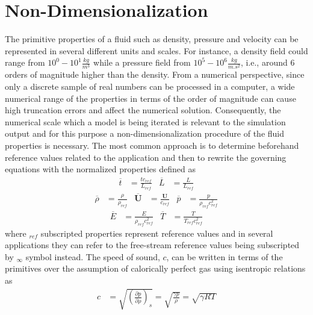 \section{Non-Dimensionalization}
%
The primitive properties of a fluid such as density, pressure and velocity can be represented in several different units and scales. For instance, a density field could range from $10^0-10^1 \frac{kg}{m^3}$ while a pressure field from $10^5-10^6 \frac{kg}{m.s^2}$, i.e., around 6 orders of magnitude higher than the density. From a numerical perspective, since only a discrete sample of real numbers can be processed in a computer, a wide numerical range of the properties in terms of the order of magnitude can cause high truncation errors and affect the numerical solution. Consequently, the numerical scale which a model is being iterated is relevant to the simulation output and for this purpose a non-dimensionalization procedure of the fluid properties is necessary. The most common approach is to determine beforehand reference values related to the application and then to rewrite the governing equations with the normalized properties defined as
%
\begin{align}
    \label{non_dim}
	\overline{t} &= \frac{t  c_{ref}}{L_{ref}} &
	\overline{L} &= \frac{L}{L_{ref}}
\end{align}
%
\begin{align}
    \label{non_dim2}
	\overline{\rho} &= \frac{\rho}{\rho_{ref}} &
	\overline{\textbf{U}} &= \frac{\textbf{U}}{c_{ref}} &
	\overline{p} &= \frac{p}{\rho_{ref} c^{2}_{ref}}
\end{align}
%
\begin{align}
    \label{non_dim3}
	\overline{E} &= \frac{E}{\rho_{ref} c^{2}_{ref}} &
	\overline{T} &= \frac{T}{T_{ref}  c^{2}_{ref}}
\end{align}
%
where $_{ref}$ subscripted properties represent reference values and in several applications they can refer to the free-stream reference values being subscripted by $_{\infty}$ symbol instead. The speed of sound, $c$, can be written in terms of the primitives over the assumption of calorically perfect gas using isentropic relations as
%
\begin{align}
    \label{sos}
    c &= \sqrt{\left(\frac{\partial p}{\partial \rho}\right)_{s}} = \sqrt{\frac{\gamma p}{\rho}} = \sqrt{\gamma R T}
\end{align}

